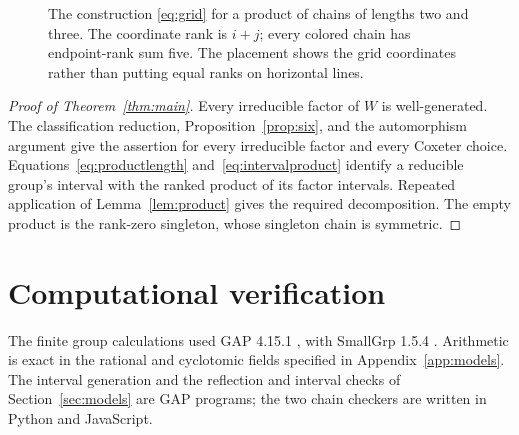 \documentclass[11pt]{article}
\theoremstyle{definition}
\begin{document}
\begin{figure}[ht]
\centering
{}
\caption{The construction \eqref{eq:grid} for a product of chains
of lengths two and three. The coordinate rank is $i+j$; every colored
chain has endpoint-rank sum five. The placement shows the grid
coordinates rather than putting equal ranks on horizontal lines.}
\label{fig:grid}
\end{figure}

\begin{proof}[Proof of Theorem~\ref{thm:main}]
Every irreducible factor of $W$ is well-generated. The classification
reduction, Proposition~\ref{prop:six}, and the
automorphism argument give the assertion for every irreducible factor
and every Coxeter choice. Equations~\eqref{eq:productlength}
and~\eqref{eq:intervalproduct} identify a reducible group's interval
with the ranked product of its factor intervals. Repeated application
of Lemma~\ref{lem:product} gives the required decomposition.
The empty product is the rank-zero singleton, whose singleton chain
is symmetric.
\end{proof}

\section{Computational verification}\label{sec:checking}
The finite group calculations used GAP 4.15.1 \cite{GAP}, with
SmallGrp 1.5.4 \cite{SmallGrp}. Arithmetic is exact in the rational and
cyclotomic fields specified in Appendix~\ref{app:models}. The interval
generation and the reflection and interval checks of
Section~\ref{sec:models} are GAP programs; the two chain checkers are
written in Python and JavaScript.
\end{document}
